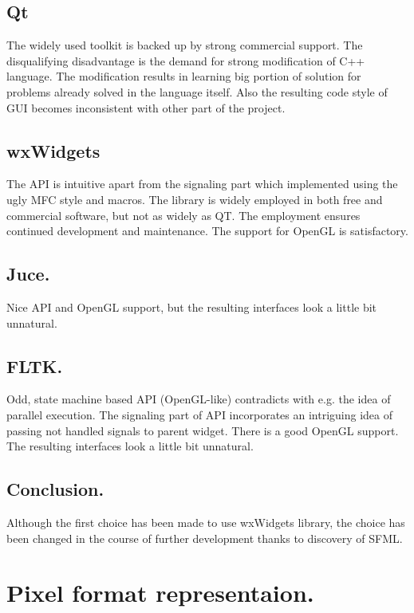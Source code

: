 \subsection{Qt}

The widely used toolkit is backed up by strong commercial support. The disqualifying disadvantage is the demand for strong modification of C++ language. The modification results in learning big portion of solution for problems already solved in the language itself. Also the resulting code style of GUI becomes inconsistent with other part of the project.

\subsection{wxWidgets}

The API is intuitive apart from the signaling part which implemented using the ugly MFC style and macros. The library is widely employed in both free and commercial software, but not as widely as QT. The employment ensures continued development and maintenance. The support for OpenGL is satisfactory.

\subsection{Juce.}
Nice API and OpenGL support, but the resulting interfaces look a little bit unnatural.

\subsection{FLTK.}
Odd, state machine based API (OpenGL-like) contradicts with e.g. the idea of parallel execution. The signaling part of API incorporates an intriguing idea of passing not handled signals to parent widget. There is a good OpenGL support. The resulting interfaces look a little bit unnatural.

\subsection{Conclusion.}
Although the first choice has been made to use wxWidgets library, the choice has been changed in the course of further development thanks to discovery of SFML.

\section{Pixel format representaion.}

